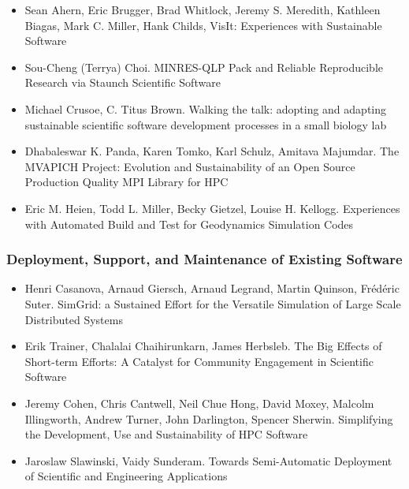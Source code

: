 \documentclass[11pt, oneside]{amsart}
\begin{document}
\begin{itemize}
\item Sean Ahern, Eric Brugger, Brad Whitlock, Jeremy S. Meredith,
  Kathleen Biagas, Mark C. Miller, Hank Childs, VisIt: Experiences
  with Sustainable Software~\cite{Ahern_WSSSPE}

\item Sou-Cheng (Terrya) Choi. MINRES-QLP Pack and Reliable
  Reproducible Research via Staunch Scientific Software~\cite{Choi_WSSSPE}

\item Michael Crusoe, C. Titus Brown. Walking the talk: adopting and
  adapting sustainable scientific software development processes in a
  small biology lab~\cite{Crusoe_WSSSPE}

\item Dhabaleswar K. Panda, Karen Tomko, Karl Schulz, Amitava Majumdar.
The MVAPICH Project: Evolution and Sustainability of an Open Source
Production Quality MPI Library for HPC~\cite{Panda_WSSSPE}

\item Eric M. Heien, Todd L. Miller, Becky Gietzel, Louise
  H. Kellogg. Experiences with Automated Build and Test for
  Geodynamics Simulation Codes~\cite{Heien_WSSSPE}

\end{itemize}

\subsubsection*{Deployment, Support, and Maintenance of Existing Software}

\begin{itemize}

\item Henri Casanova, Arnaud Giersch, Arnaud Legrand, Martin Quinson,
  Fr\'{e}d\'{e}ric Suter. SimGrid: a Sustained Effort for the
  Versatile Simulation of Large Scale Distributed
  Systems~\cite{Casanova_WSSSPE}

\item Erik Trainer, Chalalai Chaihirunkarn, James Herbsleb. The Big
  Effects of Short-term Efforts: A Catalyst for Community Engagement
  in Scientific Software~\cite{Trainer_WSSSPE}

\item Jeremy Cohen, Chris Cantwell, Neil Chue Hong, David Moxey,
  Malcolm Illingworth, Andrew Turner, John Darlington, Spencer
  Sherwin. Simplifying the Development, Use and Sustainability of HPC
  Software~\cite{Cohen_WSSSPE}

\item Jaroslaw Slawinski, Vaidy Sunderam. Towards Semi-Automatic
  Deployment of Scientific and Engineering Applications~\cite{Slawinski_WSSSPE}

\end{itemize}
\end{document}
